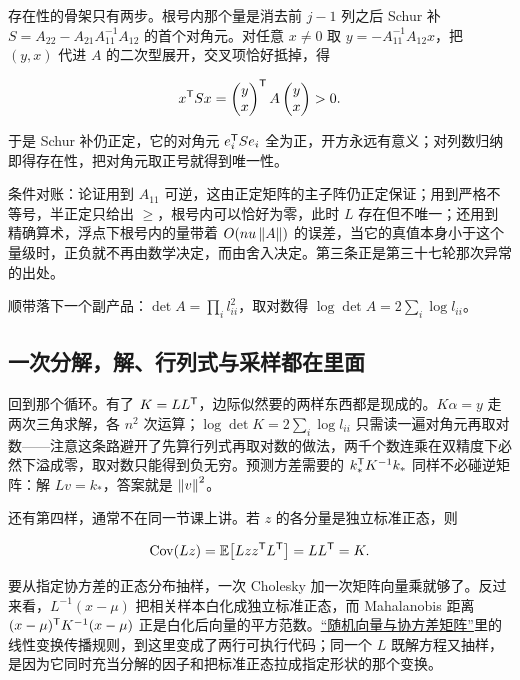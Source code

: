 存在性的骨架只有两步。根号内那个量是消去前 \(j-1\) 列之后 Schur 补 \(S=A_{22}-A_{21}A_{11}^{-1}A_{12}\) 的首个对角元。对任意 \(x\ne0\) 取 \(y=-A_{11}^{-1}A_{12}x\)，把 \((y,x)\) 代进 \(A\) 的二次型展开，交叉项恰好抵掉，得

\[
x^{\mathsf{T}}Sx=\begin{pmatrix}y\\x\end{pmatrix}^{\mathsf{T}}A\begin{pmatrix}y\\x\end{pmatrix}>0 .
\]

于是 Schur 补仍正定，它的对角元 \(e_i^{\mathsf{T}}Se_i\) 全为正，开方永远有意义；对列数归纳即得存在性，把对角元取正号就得到唯一性。

条件对账：论证用到 \(A_{11}\) 可逆，这由正定矩阵的主子阵仍正定保证；用到严格不等号，半正定只给出 \(\ge\)，根号内可以恰好为零，此时 \(L\) 存在但不唯一；还用到精确算术，浮点下根号内的量带着 \(O(nu\left\lVert A\right\rVert)\) 的误差，当它的真值本身小于这个量级时，正负就不再由数学决定，而由舍入决定。第三条正是第三十七轮那次异常的出处。

顺带落下一个副产品：\(\det A=\prod_i l_{ii}^2\)，取对数得 \(\log\det A=2\sum_i\log l_{ii}\)。

\subsection{一次分解，解、行列式与采样都在里面}

回到那个循环。有了 \(K=LL^{\mathsf{T}}\)，边际似然要的两样东西都是现成的。\(K\alpha=y\) 走两次三角求解，各 \(n^2\) 次运算；\(\log\det K=2\sum_i\log l_{ii}\) 只需读一遍对角元再取对数——注意这条路避开了先算行列式再取对数的做法，两千个数连乘在双精度下必然下溢成零，取对数只能得到负无穷。预测方差需要的 \(k_*^{\mathsf{T}}K^{-1}k_*\) 同样不必碰逆矩阵：解 \(Lv=k_*\)，答案就是 \(\left\lVert v\right\rVert^2\)。

还有第四样，通常不在同一节课上讲。若 \(z\) 的各分量是独立标准正态，则

\[
\operatorname{Cov}(Lz)=\mathbb{E}\bigl[Lzz^{\mathsf{T}}L^{\mathsf{T}}\bigr]=LL^{\mathsf{T}}=K .
\]

要从指定协方差的正态分布抽样，一次 Cholesky 加一次矩阵向量乘就够了。反过来看，\(L^{-1}(x-\mu)\) 把相关样本白化成独立标准正态，而 Mahalanobis 距离 \((x-\mu)^{\mathsf{T}}K^{-1}(x-\mu)\) 正是白化后向量的平方范数。\hyperref[sec:05-Probability/05-Joint-Distributions/04]{``随机向量与协方差矩阵''}里的线性变换传播规则，到这里变成了两行可执行代码；同一个 \(L\) 既解方程又抽样，是因为它同时充当分解的因子和把标准正态拉成指定形状的那个变换。

